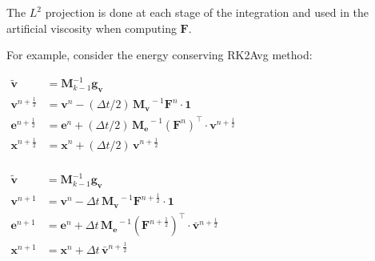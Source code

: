 \documentclass[8pt,xcolor=svgnames]{beamer}
\newcommand{\myem}[1]{{\textcolor{myorange}{#1}}}
\begin{document}
\begin{frame}
\medskip

The $L^2$ projection is done at each stage of the integration and used in the artificial viscosity when computing $\mathbf{F}$.

\medskip

For example, consider the \myem{energy conserving} RK2Avg method:
\begin{center}
\begin{minipage}[c]{0.425\textwidth}\begin{alertblock}{}\centering
$
\begin{aligned}
\mathbf{\tilde v} &= \mathbf{M}_{k-1}^{-1}\mathbf{g_v}\\
\mathbf{v}^{n+\frac{1}{2}} &= \mathbf{v}^{n} - (\Delta t/2)\, \mathbf{M_v}^{\!\!-1} \mathbf{F}^n\cdot \mathbf{1} \\
\mathbf{e}^{n+\frac{1}{2}} &= \mathbf{e}^{n} + (\Delta t/2)\, \mathbf{M_e}^{\!\!-1} (\mathbf{F}^n)^\top \cdot \mathbf{v}^{n+\frac{1}{2}} \\
\mathbf{x}^{n+\frac{1}{2}} &= \mathbf{x}^{n} + (\Delta t/2)\, \mathbf{v}^{n+\frac{1}{2}}\\
\end{aligned}
$
\end{alertblock}\end{minipage}
\hspace{0.09\textwidth}
\begin{minipage}[c]{0.425\textwidth}\begin{alertblock}{}\centering
$
\begin{aligned}
\mathbf{\tilde v} &= \mathbf{M}_{k-1}^{-1}\mathbf{g_v}\\
\mathbf{v}^{n+1} &= \mathbf{v}^{n} - \Delta t\,  \mathbf{M_v}^{\!\!-1} \mathbf{F}^{n+\frac{1}{2}}\cdot \mathbf{1} \\
\mathbf{e}^{n+1} &= \mathbf{e}^{n} + \Delta t\,  \mathbf{M_e}^{\!\!-1} (\mathbf{F}^{n+\frac{1}{2}})^\top \cdot \bar{\mathbf{v}}^{n+\frac{1}{2}} \\
\mathbf{x}^{n+1} &= \mathbf{x}^{n} +  \Delta t\, \bar{\mathbf{v}}^{n+\frac{1}{2}}\\
\end{aligned}
$
\end{alertblock}\end{minipage}
\end{center}

\end{frame}
\end{document}
